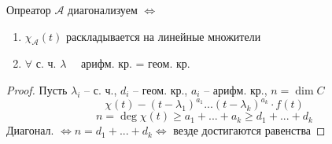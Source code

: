 \begin{implication}
	Опреатор $ \mathcal{A} $ диагонализуем $ \iff $
	\begin{enumerate}
		\item $ \chi_{\mathcal{A}}(t) $ раскладывается на линейные множители
		\item $ \forall $ с. ч. $ \lambda \quad $ арифм. кр. = геом. кр.
	\end{enumerate}
\end{implication}

\begin{proof}
	Пусть $ \lambda_i $ -- с. ч., $ d_i $ -- геом. кр., $ a_i $ -- арифм. кр., $ n = \dim C $
	$$ \chi(t) - (t - \lambda_1)^{a_1} ...(t - \lambda_k)^{a_k} \cdot f(t) $$
	$$ n = \deg \chi(t) \ge a_1 + ... + a_k \ge d_1 + ... + d_k $$
	Диагонал. $ \iff n = d_1 + ... + d_k \iff $ везде достигаются равенства
\end{proof}
